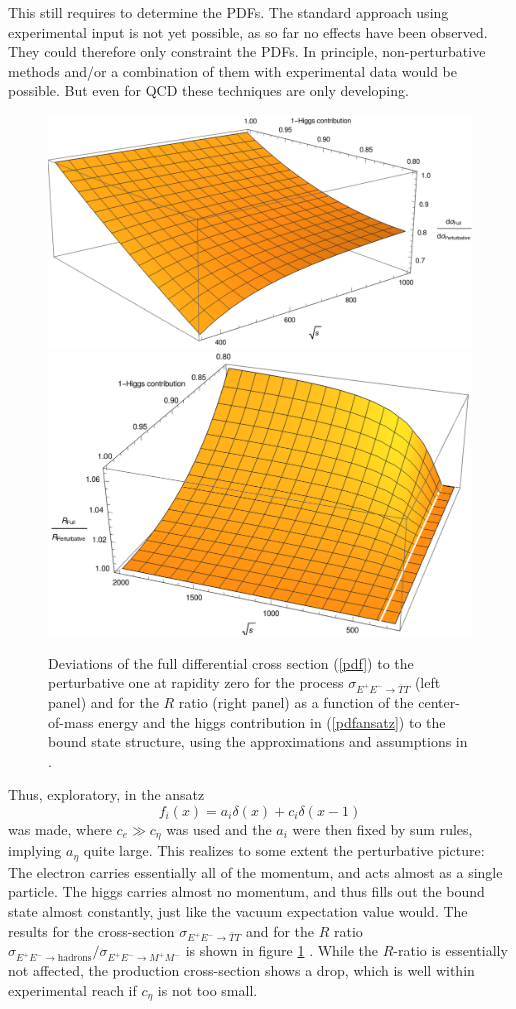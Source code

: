 \documentclass[final,12pt,3p,longtitle]{elsarticle}
\newcommand*{\no}{\noindent}
\newcommand*{\be}{\begin{equation}}
\newcommand*{\ee}{\end{equation}}
\newcommand*{\pref}[1]{(\ref{#1})}
\newcommand*{\1}{1\!\!\!\bot}
\begin{document}
This still requires to determine the PDFs. The standard approach using experimental input \cite{Gao:2017yyd} is not yet possible, as so far no effects have been observed. They could therefore only constraint the PDFs. In principle, non-perturbative methods \cite{Nguyen:2011jy,Lin:2014zya,Chen:2016utp,Lin:2017snn} and/or a combination of them with experimental data \cite{Nocera:2017war,Lin:2017snn} would be possible. But even for QCD these techniques are only developing.

\begin{figure}
\includegraphics[width=0.5\linewidth]{enhancement}\includegraphics[width=0.5\linewidth]{rratio-all}
\caption{\label{fig:pdf}Deviations of the full differential cross section \pref{pdf} to the perturbative one at rapidity zero for the process $\sigma_{E^+E^-\to\bar{T}T}$ (left panel) and for the $R$ ratio (right panel) as a function of the center-of-mass energy and the higgs contribution in \pref{pdfansatz} to the bound state structure, using the approximations and assumptions in \cite{Egger:2017tkd,Maas:2017swq}.}
\end{figure}

Thus, exploratory, in \cite{Egger:2017tkd} the ansatz
\be
f_i(x)=a_i\delta(x)+c_i\delta(x-1)\label{pdfansatz}
\ee
\no was made, where $c_e\gg c_\eta$ was used and the $a_i$ were then fixed by sum rules, implying $a_\eta$ quite large. This realizes to some extent the perturbative picture: The electron carries essentially all of the momentum, and acts almost as a single particle. The higgs carries almost no momentum, and thus fills out the bound state almost constantly, just like the vacuum expectation value would. The results for the cross-section $\sigma_{E^+E^-\to\bar{T}T}$ and for the $R$ ratio $\sigma_{E^+E^-\to\text{hadrons}}/\sigma_{E^+E^-\to M^+M^-}$ is shown in figure \ref{fig:pdf} \cite{Egger:2017tkd,Maas:2017swq}. While the $R$-ratio is essentially not affected, the production cross-section shows a drop, which is well within experimental reach if $c_\eta$ is not too small.
\end{document}
